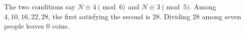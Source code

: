 The two conditions say $N\equiv4\pmod6$ and $N\equiv3\pmod5$. Among $4,10,16,22,28$, the first satisfying the second is $28$. Dividing $28$ among seven people leaves $\boxed0$ coins.

